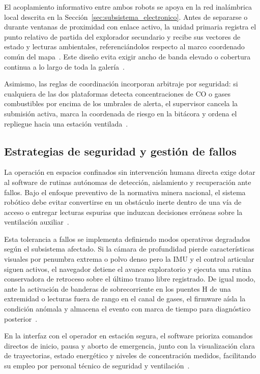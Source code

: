 El acoplamiento informativo entre ambos robots se apoya en la red inalámbrica local descrita en la Sección~\ref{sec:subsistema_electronico}. Antes de separarse o durante ventanas de proximidad con enlace activo, la unidad primaria registra el punto relativo de partida del explorador secundario y recibe sus vectores de estado y lecturas ambientales, referenciándolos respecto al marco coordenado común del mapa~\cite{olfati2007consensus}. Este diseño evita exigir ancho de banda elevado o cobertura continua a lo largo de toda la galería~\cite{OSINERGMIN_BoletinGSM_2020}.

Asimismo, las reglas de coordinación incorporan arbitraje por seguridad: si cualquiera de las dos plataformas detecta concentraciones de $\text{CO}$ o gases combustibles por encima de los umbrales de alerta, el supervisor cancela la submisión activa, marca la coordenada de riesgo en la bitácora y ordena el repliegue hacia una estación ventilada~\cite{MINEM_DS024_2016, EU_ExposureDirective_2020}.

\subsection{Estrategias de seguridad y gestión de fallos}

La operación en espacios confinados sin intervención humana directa exige dotar al software de rutinas autónomas de detección, aislamiento y recuperación ante fallos. Bajo el enfoque preventivo de la normativa minera nacional, el sistema robótico debe evitar convertirse en un obstáculo inerte dentro de una vía de acceso o entregar lecturas espurias que induzcan decisiones erróneas sobre la ventilación auxiliar~\cite{MINEM_DS024_2016, MINEM_Yanaquihua_2023}.

Esta tolerancia a fallos se implementa definiendo modos operativos degradados según el subsistema afectado. Si la cámara de profundidad pierde características visuales por penumbra extrema o polvo denso pero la IMU y el control articular siguen activos, el navegador detiene el avance exploratorio y ejecuta una rutina conservadora de retroceso sobre el último tramo libre registrado. De igual modo, ante la activación de banderas de sobrecorriente en los puentes H de una extremidad o lecturas fuera de rango en el canal de gases, el firmware aísla la condición anómala y almacena el evento con marca de tiempo para diagnóstico posterior~\cite{OSINERGMIN_BoletinGSM_Ventilacion_2020, Cortez2016_GEI_Minas}.

En la interfaz con el operador en estación segura, el software prioriza comandos directos de inicio, pausa y aborto de emergencia, junto con la visualización clara de trayectorias, estado energético y niveles de concentración medidos, facilitando su empleo por personal técnico de seguridad y ventilación~\cite{AdvancesMining_2023}.

